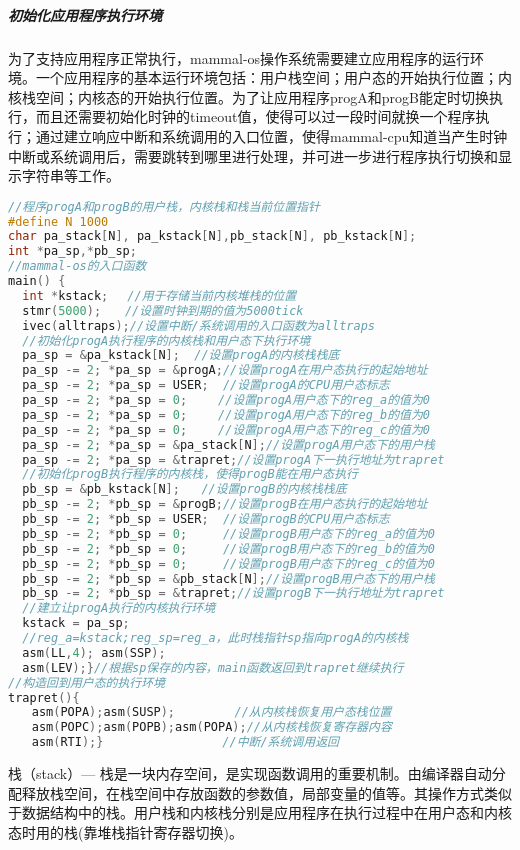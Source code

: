\subparagraph{初始化应用程序执行环境}
为了支持应用程序正常执行，mammal-os操作系统需要建立应用程序的运行环境。一个应用程序的基本运行环境包括：用户栈空间；用户态的开始执行位置；内核栈空间；内核态的开始执行位置。为了让应用程序progA和progB能定时切换执行，而且还需要初始化时钟的timeout值，使得可以过一段时间就换一个程序执行；通过建立响应中断和系统调用的入口位置，使得mammal-cpu知道当产生时钟中断或系统调用后，需要跳转到哪里进行处理，并可进一步进行程序执行切换和显示字符串等工作。

\begin{lstlisting}[language={C}]
//程序progA和progB的用户栈，内核栈和栈当前位置指针
#define N 1000
char pa_stack[N], pa_kstack[N],pb_stack[N], pb_kstack[N];
int *pa_sp,*pb_sp;
//mammal-os的入口函数
main() {
  int *kstack;　 //用于存储当前内核堆栈的位置　　　　　　　　　　　　　　 
  stmr(5000);　　//设置时钟到期的值为5000tick
  ivec(alltraps);//设置中断/系统调用的入口函数为alltraps
  //初始化progA执行程序的内核栈和用户态下执行环境
  pa_sp = &pa_kstack[N];  //设置progA的内核栈栈底
  pa_sp -= 2; *pa_sp = &progA;//设置progA在用户态执行的起始地址
  pa_sp -= 2; *pa_sp = USER;  //设置progA的CPU用户态标志
  pa_sp -= 2; *pa_sp = 0; 　　//设置progA用户态下的reg_a的值为0
  pa_sp -= 2; *pa_sp = 0; 　　//设置progA用户态下的reg_b的值为0
  pa_sp -= 2; *pa_sp = 0; 　　//设置progA用户态下的reg_c的值为0
  pa_sp -= 2; *pa_sp = &pa_stack[N];//设置progA用户态下的用户栈
  pa_sp -= 2; *pa_sp = &trapret;//设置progA下一执行地址为trapret  
  //初始化progB执行程序的内核栈，使得progB能在用户态执行  
  pb_sp = &pb_kstack[N];   //设置progB的内核栈栈底
  pb_sp -= 2; *pb_sp = &progB;//设置progB在用户态执行的起始地址
  pb_sp -= 2; *pb_sp = USER;  //设置progB的CPU用户态标志
  pb_sp -= 2; *pb_sp = 0;     //设置progB用户态下的reg_a的值为0
  pb_sp -= 2; *pb_sp = 0;     //设置progB用户态下的reg_b的值为0
  pb_sp -= 2; *pb_sp = 0;     //设置progB用户态下的reg_c的值为0
  pb_sp -= 2; *pb_sp = &pb_stack[N];//设置progB用户态下的用户栈
  pb_sp -= 2; *pb_sp = &trapret;//设置progB下一执行地址为trapret
  //建立让progA执行的内核执行环境
  kstack = pa_sp;
  //reg_a=kstack;reg_sp=reg_a，此时栈指针sp指向progA的内核栈
  asm(LL,4); asm(SSP);
  asm(LEV);}//根据sp保存的内容，main函数返回到trapret继续执行 
//构造回到用户态的执行环境
trapret(){
　　asm(POPA);asm(SUSP);　　　　　//从内核栈恢复用户态栈位置
　　asm(POPC);asm(POPB);asm(POPA);//从内核栈恢复寄存器内容
　　asm(RTI);}　　　　　　　　　　//中断/系统调用返回
\end{lstlisting}

\begin{note} 
栈（stack）— 栈是一块内存空间，是实现函数调用的重要机制。由编译器自动分配释放栈空间，在栈空间中存放函数的参数值，局部变量的值等。其操作方式类似于数据结构中的栈。用户栈和内核栈分别是应用程序在执行过程中在用户态和内核态时用的栈(靠堆栈指针寄存器切换)。
\end{note} 

